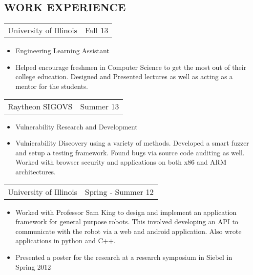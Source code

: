 \documentclass[margin]{res}
\begin{document}
\begin{resume}
\section{WORK EXPERIENCE}
\begin{tabular}{p{3in} r} %
                  University of Illinois &  Fall 13
                  \end{tabular}
                   \begin{itemize} \itemsep -2pt %
                     \item Engineering Learning Assistant
                     \item Helped encourage freshmen in Computer
                       Science to get the most out of their college
                       education.  Designed and Presented lectures as
                       well as acting as a mentor for the students.
		   \end{itemize}
\begin{tabular}{p{3in} r} %
                  Raytheon SIGOVS &  Summer 13
                  \end{tabular}
                   \begin{itemize} \itemsep -2pt %
                    \item Vulnerability Research and Development
                    \item Vulnierability Discovery using a variety of
                      methods.  Developed a smart fuzzer and setup a
                      testing framework.  Found bugs via source code
                      auditing as well.  Worked with browser security
                      and applications on both x86 and ARM architectures.
		   \end{itemize}
		 \begin{tabular}{p{3in} r}
                  University of Illinois &  Spring - Summer 12
                 \end{tabular}
		  \begin{itemize} \itemsep -2pt
                   \item Worked with Professor Sam King to design
                     and implement an application framework for
                     general purpose robots.  This involved developing
                     an API to communicate with the robot via a web
                     and android application.  Also wrote applications
                     in python and C++.
                   \item Presented a poster for
                     the research at a research symposium in Siebel in
                     Spring 2012
                  \end{itemize}


\end{resume}
\end{document}

